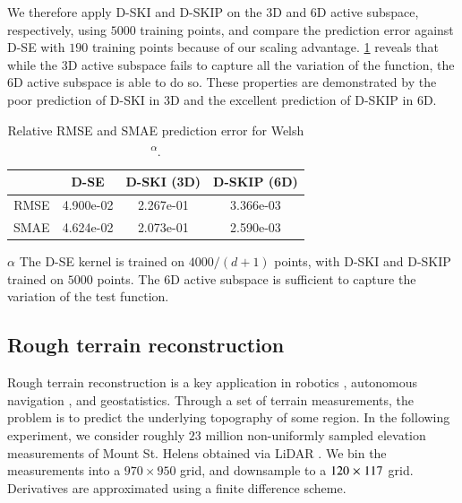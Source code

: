 We therefore apply D-SKI and D-SKIP on the 3D and 6D active subspace,
respectively, using $5000$ training points, and compare the prediction error
against D-SE with $190$ training points because of our scaling advantage. 
\cref{tab:dim_red} reveals that while the 3D active subspace fails to capture
all the variation of the function, the 6D active subspace is able to do so.
These properties are demonstrated by the poor prediction of D-SKI in 3D and the
excellent prediction of D-SKIP in 6D. 

\begin{table}[ht]
  \centering
  \caption{Relative RMSE and SMAE prediction error for Welsh
  \textsuperscript{$\alpha$}.}\label{tab:dim_red}
  \begin{threeparttable}
    \begin{tabular}{r c c c}
      \toprule
      & D-SE & D-SKI (3D) & D-SKIP (6D) \\ \midrule
      RMSE & 4.900e-02 & 2.267e-01 & 3.366e-03 \\
      SMAE & 4.624e-02 & 2.073e-01 & 2.590e-03 \\
      \bottomrule
    \end{tabular}
    \begin{tablenotes}
      \item[$\alpha$]The D-SE kernel is trained on $4000/(d+1)$ points, with
      D-SKI and D-SKIP trained on $5000$ points. The 6D active subspace is
      sufficient to capture the variation of the test function.
    \end{tablenotes}
  \end{threeparttable}
\end{table}



\subsection{Rough terrain reconstruction}

Rough terrain reconstruction is a key application in robotics 
\cite{gingras2010rough, konolige2010large}, autonomous navigation 
\cite{hadsell2010accurate}, and geostatistics. Through a set of terrain
measurements, the problem is to predict the underlying topography of some
region. In the following experiment, we consider roughly $23$ million
non\hyp{}uniformly sampled elevation measurements of Mount St. Helens obtained
via LiDAR \cite{sthelen2002lidar}. We bin the measurements into a $970\times
950$ grid, and downsample to a $120\mathrel{\times} 117$ grid. Derivatives are
approximated using a finite difference scheme.

